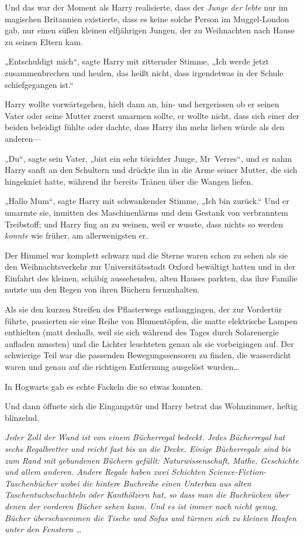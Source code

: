 {Und das war der Moment als Harry realisierte, dass der \emph{Junge der lebte} nur im magischen Britannien existierte, dass es keine solche Person im Muggel-London gab, nur einen süßen kleinen elfjährigen Jungen, der zu Weihnachten nach Hause zu seinen Eltern kam.

„Entschuldigt mich“, sagte Harry mit zitternder Stimme, „Ich werde jetzt zusammenbrechen und heulen, das heißt nicht, dass irgendetwas in der Schule schiefgegangen ist.“

Harry wollte vorwärtsgehen, hielt dann an, hin- und hergerissen ob er seinen Vater oder seine Mutter zuerst umarmen sollte, er wollte nicht, dass sich einer der beiden beleidigt fühlte oder dachte, dass Harry ihn mehr lieben würde als den anderen—

„Du“, sagte sein Vater, „bist ein sehr törichter Junge, Mr~Verres“, und er nahm Harry sanft an den Schultern und drückte ihn in die Arme seiner Mutter, die sich hingekniet hatte, während ihr bereits Tränen über die Wangen liefen.

„Hallo Mum“, sagte Harry mit schwankender Stimme, „Ich bin zurück.“ Und er umarmte sie, inmitten des Maschinenlärms und dem Gestank von verbranntem Treibstoff; und Harry fing an zu weinen, weil er wusste, dass nichts so werden \emph{konnte} wie früher, am allerwenigsten er.

Der Himmel war komplett schwarz und die Sterne waren schon zu sehen als sie den Weihnachtsverkehr zur Universitätsstadt Oxford bewältigt hatten und in der Einfahrt des kleinen, schäbig aussehenden, alten Hauses parkten, das ihre Familie nutzte um den Regen von ihren Büchern fernzuhalten.

Als sie den kurzen Streifen des Pflasterwegs entlanggingen, der zur Vordertür führte, passierten sie eine Reihe von Blumentöpfen, die matte elektrische Lampen enthielten (matt deshalb, weil sie sich während des Tages durch Solarenergie aufladen mussten) und die Lichter leuchteten genau als sie vorbeigingen auf. Der schwierige Teil war die passenden Bewegungssensoren zu finden, die wasserdicht waren und genau auf die richtigen Entfernung ausgelöst wurden…

In Hogwarts gab es echte Fackeln die so etwas konnten.

Und dann öffnete sich die Eingangstür und Harry betrat das Wohnzimmer, heftig blinzelnd.

\emph{Jeder Zoll der Wand ist von einem Bücherregal bedeckt. Jedes Bücherregal hat sechs Regalbretter und reicht fast bis an die Decke. Einige Bücherregale sind bis zum Rand mit gebundenen Büchern gefüllt: Naturwissenschaft, Mathe, Geschichte und allem anderen. Andere Regale haben zwei Schichten Science-Fiction-Taschenbücher wobei die hintere Buchreihe einen Unterbau aus alten Taschentuchschachteln oder Kanthölzern hat, so dass man die Buchrücken über denen der vorderen Bücher sehen kann. Und es ist immer noch} \emph{nicht genug. Bücher überschwemmen die Tische und Sofas und türmen sich zu kleinen Haufen unter den Fenstern …}

}
